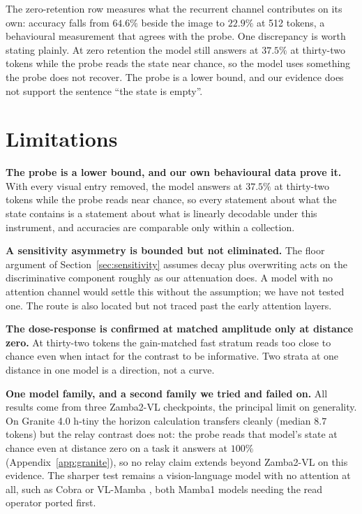 The zero-retention row measures what the recurrent channel contributes on its
own: accuracy falls from $64.6\%$ beside the image to $22.9\%$ at 512 tokens,
a behavioural measurement that agrees with the probe. One discrepancy is worth
stating plainly. At zero retention the model still answers at $37.5\%$ at
thirty-two tokens while the probe reads the state near chance, so the model
uses something the probe does not recover. The probe is a lower bound, and our
evidence does not support the sentence ``the state is empty''.

\section{Limitations}

\textbf{The probe is a lower bound, and our own behavioural data prove it.}
With every visual entry removed, the model answers at $37.5\%$ at thirty-two
tokens while the probe reads near chance, so every statement about what the
state contains is a statement about what is linearly decodable under this
instrument, and accuracies are comparable only within a collection.

\textbf{A sensitivity asymmetry is bounded but not eliminated.} The floor
argument of Section~\ref{sec:sensitivity} assumes decay plus overwriting acts
on the discriminative component roughly as our attenuation does. A model with
no attention channel would settle this without the assumption; we have not
tested one. The route is also located but not traced past the early attention
layers.

\textbf{The dose-response is confirmed at matched amplitude only at distance
zero.} At thirty-two tokens the gain-matched fast stratum reads too close to
chance even when intact for the contrast to be informative. Two strata at one
distance in one model is a direction, not a curve.

\textbf{One model family, and a second family we tried and failed on.} All
results come from three Zamba2-VL checkpoints, the principal limit on
generality. On Granite 4.0 h-tiny \citep{granite4} the horizon calculation
transfers cleanly (median $8.7$ tokens) but the relay contrast does not: the
probe reads that model's state at chance even at distance zero on a task it
answers at $100\%$ (Appendix~\ref{app:granite}), so no relay claim extends
beyond Zamba2-VL on this evidence. The sharper test remains a vision-language
model with no attention at all, such as Cobra \citep{zhao2025cobra} or
VL-Mamba \citep{qiao2024vlmamba}, both Mamba1 models needing the read
operator ported first.

